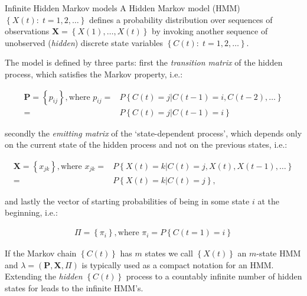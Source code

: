 \begin{remark}{Infinite Hidden Markov models\label{ref:infinite_hidden_markov}}
A Hidden Markov model (HMM) $\left\{ X\left(t\right):\; t=1,2,\ldots\right\}$ defines a probability distribution over sequences of observations $\mathbf{X}=\left\{ X(1), \ldots,X(t) \right\}$ by invoking another sequence of unobserved (\emph{hidden}) discrete state variables $\left\{ C\left(t\right):\; t=1,2,\ldots\right\}$.
 
The model is defined by three parts: first the \emph{transition matrix} of the hidden process, which satisfies the Markov property, i.e.:

\begin{align}
\mathbf{P}=\left\{ p_{ij}\right\} ,\text{where }p_{ij}=& P\left\{ C\left(t\right)=j|C\left(t-1\right)=i,C\left(t-2\right),\ldots \right\} \nonumber \\ 
=& P\left\{ C\left(t\right)=j|C\left(t-1\right)=i\right\} 
\label{eq:hmm_trans}
\end{align}

\noindent
secondly the \emph{emitting matrix} of the `state-dependent process', which depends only on the current state of the hidden process and not on the previous states, i.e.:

\begin{align}
\mathbf{X}=\left\{ x_{jk}\right\} ,\text{where }x_{jk}=& P\left\{ X\left(t\right)=k|C\left(t\right)=j,X\left(t\right),X\left(t-1\right),\ldots \right\} \nonumber \\
=&P\left\{ X\left(t\right)=k|C\left(t\right)=j\right\} ,
\label{eq:hmm_emit}
\end{align}

\noindent
and lastly the vector of starting probabilities of being in some state $i$ at the beginning, i.e.:

\begin{align}
\Pi=\left\{ \pi_{i}\right\} ,\text{where }\pi_{i}=P\left\{ C\left(t=1\right)=i\right\} 
\label{eq:hmm_start}
\end{align}

\noindent
If the Markov chain $\left\{ C\left(t\right) \right\}$ has $m$ states we call $\left\{ X\left(t\right) \right\}$ an $m$-state HMM and $\lambda=\left(\mathbf{P},\mathbf{X},\Pi\right)$ is typically used as a compact notation for an HMM.
Extending the \emph{hidden} $\left\{ C\left(t\right) \right\}$ process to a countably infinite number of hidden states for leads to the infinite HMM's.
\end{remark}

